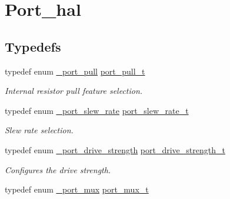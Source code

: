 \hypertarget{group__port__hal}{}\section{Port\+\_\+hal}
\label{group__port__hal}
\subsection*{Typedefs}
\begin{DoxyCompactItemize}
\item 
typedef enum \hyperlink{group__port__hal_gac523311af56d02fec0355dd272607d2d}{\+\_\+port\+\_\+pull} \hyperlink{group__port__hal_ga09c4df11e7e6c77f1b669ea5ee920a3d}{port\+\_\+pull\+\_\+t}\hypertarget{group__port__hal_ga09c4df11e7e6c77f1b669ea5ee920a3d}{}\label{group__port__hal_ga09c4df11e7e6c77f1b669ea5ee920a3d}

\begin{DoxyCompactList}\small\item\em Internal resistor pull feature selection. \end{DoxyCompactList}\item 
typedef enum \hyperlink{group__port__hal_ga39dfc59254a6c31e31aed71de831b6a2}{\+\_\+port\+\_\+slew\+\_\+rate} \hyperlink{group__port__hal_ga52d4e11f104f43083057c43efe4b7471}{port\+\_\+slew\+\_\+rate\+\_\+t}\hypertarget{group__port__hal_ga52d4e11f104f43083057c43efe4b7471}{}\label{group__port__hal_ga52d4e11f104f43083057c43efe4b7471}

\begin{DoxyCompactList}\small\item\em Slew rate selection. \end{DoxyCompactList}\item 
typedef enum \hyperlink{group__port__hal_ga17fdac515979a1b6cefc0135add46f42}{\+\_\+port\+\_\+drive\+\_\+strength} \hyperlink{group__port__hal_ga88750b7901b7391d1371cd7118596587}{port\+\_\+drive\+\_\+strength\+\_\+t}\hypertarget{group__port__hal_ga88750b7901b7391d1371cd7118596587}{}\label{group__port__hal_ga88750b7901b7391d1371cd7118596587}

\begin{DoxyCompactList}\small\item\em Configures the drive strength. \end{DoxyCompactList}\item 
typedef enum \hyperlink{group__port__hal_gac926cac9eed74e607a4034ce1e210cb7}{\+\_\+port\+\_\+mux} \hyperlink{group__port__hal_ga8099d2a158fb74799ba4861dd81eb691}{port\+\_\+mux\+\_\+t}\hypertarget{group__port__hal_ga8099d2a158fb74799ba4861dd81eb691}{}\label{group__port__hal_ga8099d2a158fb74799ba4861dd81eb691}


\end{DoxyCompactItemize}
